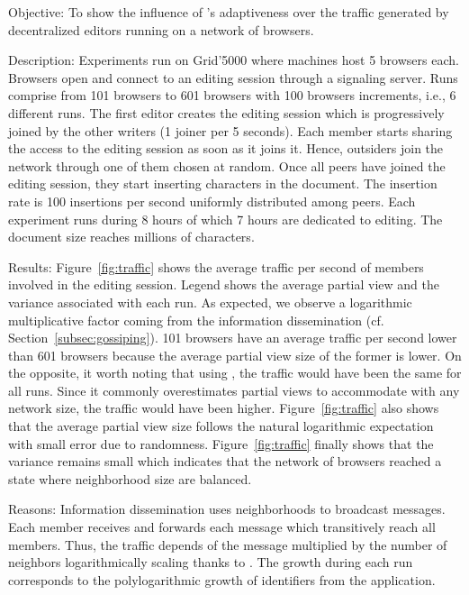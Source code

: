 \begin{asparadesc}
\item [Objective:] To show the influence of \SPRAY's adaptiveness over the
  traffic generated by decentralized editors running on a network of browsers.
\item [Description:] Experiments run on Grid'5000 where machines host 5 browsers
  each. Browsers open \CRATE and connect to an editing session through a
  signaling server.  Runs comprise from 101 browsers to 601 browsers with 100
  browsers increments, i.e., 6 different runs.  The first editor creates the
  editing session which is progressively joined by the other writers (1 joiner
  per 5 seconds). Each member starts sharing the access to the editing session
  as soon as it joins it. Hence, outsiders join the network through one of them
  chosen at random. Once all peers have joined the editing session, they start
  inserting characters in the document. The insertion rate is 100 insertions per
  second uniformly distributed among peers. Each experiment runs during 8 hours
  of which 7 hours are dedicated to editing. The document size reaches millions
  of characters.
\item [Results:] Figure~\ref{fig:traffic} shows the average traffic per second
  of members involved in the editing session. Legend shows the average partial
  view and the variance associated with each run. As expected, we observe a
  logarithmic multiplicative factor coming from the information dissemination
  (cf. Section~\ref{subsec:gossiping}). 101 browsers have an average traffic per
  second lower than 601 browsers because the average partial view size of the
  former is lower.  On the opposite, it worth noting that using \CYCLON, the
  traffic would have been the same for all runs. Since it commonly overestimates
  partial views to accommodate with any network size, the traffic would have
  been higher. Figure~\ref{fig:traffic} also shows that the average partial view
  size follows the natural logarithmic expectation with small error due to
  randomness. Figure~\ref{fig:traffic} finally shows that the variance remains
  small which indicates that the network of browsers reached a state where
  neighborhood size are balanced.
\item [Reasons:] Information dissemination uses neighborhoods to broadcast
  messages. Each member receives and forwards each message which transitively
  reach all members. Thus, the traffic depends of the message multiplied by the
  number of neighbors logarithmically scaling thanks to \SPRAY. The growth
  during each run corresponds to the polylogarithmic growth of identifiers from
  the application.
\end{asparadesc}
